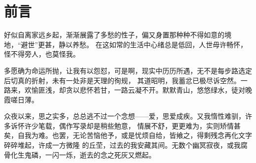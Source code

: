 \part{前言}

\vspace*{2\ccwd}

\hspace*{2em} 好似自离家远乡起，渐渐展露了多愁的性子，偏又身置那种种不得如意的境地，“避世”更甚，静以养愁。
在这如常的生活中心绪总是低回，人世毋许畅怀，怪不得旁人，也莫怪我。

\vspace*{\ccwd}

\hspace*{2em} 多愿确为命运所抛，让我有以怨怼，可是啊，现实中历历所遇，无不是每步路选定后切真的折射，未有一处非是天理的徇规，
其道昭明，我蓄忿已极尽诉空然。一路来，欢愉匪浅，却贪以悲怀若甘，一路云凝不开。默默青山，悠悠绿水，徒对晚霞嗟日薄。

\vspace*{\ccwd}

\hspace*{2em} 众夜以来，思之实多，总总逃不过一个念想——爱，思爱成疾。又我惰性难驯，许多诉怀许少笔载，偶作写录却是稍些勉意，
情展不舒，更更难为，实则矫情甚矣，自我为难。也罢，无论苦恼他予，或是忧烦自给，皆飨之，得剩残念再化文字碎碎堆起，许成一方微隆
的丘茔，过去的我安藏其间。无数个幽冥寂夜，或我腐骨化生鬼磷，一闪一烁，逝去的念之死灰又燃起。

\newpage